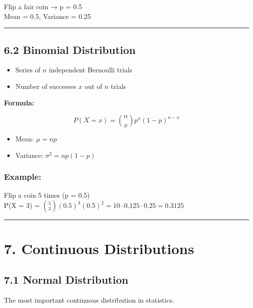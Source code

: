 \documentclass[
  letterpaper,
  DIV=11,
  numbers=noendperiod]{scrreprt}
\providecommand{\tightlist}{%
  \setlength{\itemsep}{0pt}\setlength{\parskip}{0pt}}
\begin{document}
Flip a fair coin → p = 0.5\\
Mean = 0.5, Variance = 0.25

\begin{center}\rule{0.5\linewidth}{0.5pt}\end{center}

\subsection{6.2 Binomial Distribution}\label{binomial-distribution}

\begin{itemize}
\tightlist
\item
  Series of \(n\) independent Bernoulli trials
\item
  Number of successes \(x\) out of \(n\) trials
\end{itemize}

\textbf{Formula:}

\[
P(X = x) = \binom{n}{x} p^x (1 - p)^{n - x}
\]

\begin{itemize}
\tightlist
\item
  Mean: \(\mu = np\)
\item
  Variance: \(\sigma^2 = np(1 - p)\)
\end{itemize}

\subsubsection{Example:}\label{example-7}

Flip a coin 5 times (p = 0.5)\\
P(X = 3) =
\(\binom{5}{3} (0.5)^3 (0.5)^2 = 10 \cdot 0.125 \cdot 0.25 = 0.3125\)

\begin{center}\rule{0.5\linewidth}{0.5pt}\end{center}

\section{7. Continuous Distributions}\label{continuous-distributions}

\subsection{7.1 Normal Distribution}\label{normal-distribution}

The most important continuous distribution in statistics.
\end{document}
